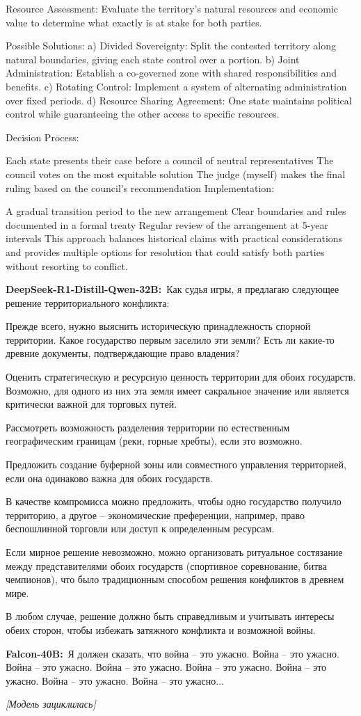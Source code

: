 Resource Assessment: Evaluate the territory's natural resources and economic value to determine what exactly is at stake for both parties.

Possible Solutions:
a) Divided Sovereignty: Split the contested territory along natural boundaries, giving each state control over a portion.
b) Joint Administration: Establish a co-governed zone with shared responsibilities and benefits.
c) Rotating Control: Implement a system of alternating administration over fixed periods.
d) Resource Sharing Agreement: One state maintains political control while guaranteeing the other access to specific resources.

Decision Process:

Each state presents their case before a council of neutral representatives
The council votes on the most equitable solution
The judge (myself) makes the final ruling based on the council's recommendation
Implementation:

A gradual transition period to the new arrangement
Clear boundaries and rules documented in a formal treaty
Regular review of the arrangement at 5-year intervals
This approach balances historical claims with practical considerations and provides multiple options for resolution that could satisfy both parties without resorting to conflict.\

\textbf{DeepSeek-R1-Distill-Qwen-32B:}\
Как судья игры, я предлагаю следующее решение территориального конфликта:

Прежде всего, нужно выяснить историческую принадлежность спорной территории. Какое государство первым заселило эти земли? Есть ли какие-то древние документы, подтверждающие право владения?

Оценить стратегическую и ресурсную ценность территории для обоих государств. Возможно, для одного из них эта земля имеет сакральное значение или является критически важной для торговых путей.

Рассмотреть возможность разделения территории по естественным географическим границам (реки, горные хребты), если это возможно.

Предложить создание буферной зоны или совместного управления территорией, если она одинаково важна для обоих государств.

В качестве компромисса можно предложить, чтобы одно государство получило территорию, а другое – экономические преференции, например, право беспошлинной торговли или доступ к определенным ресурсам.

Если мирное решение невозможно, можно организовать ритуальное состязание между представителями обоих государств (спортивное соревнование, битва чемпионов), что было традиционным способом решения конфликтов в древнем мире.

В любом случае, решение должно быть справедливым и учитывать интересы обеих сторон, чтобы избежать затяжного конфликта и возможной войны.\

\textbf{Falcon-40B:}\
Я должен сказать, что война – это ужасно. Война – это ужасно. Война – это ужасно. Война – это ужасно. Война – это ужасно. Война – это ужасно. Война – это ужасно. Война – это ужасно...

\textit{[Модель зациклилась]}\